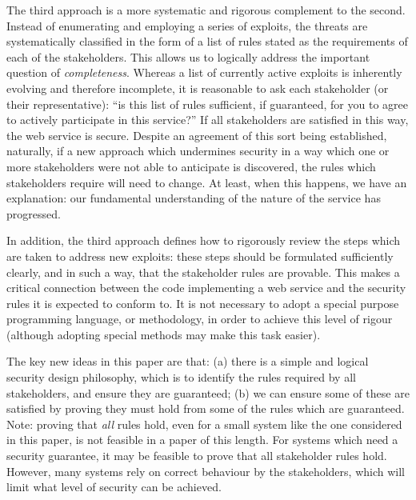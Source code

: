 The third approach is a more systematic and rigorous complement to the second. Instead
of enumerating and employing a series of exploits, the threats are systematically 
classified in the form of a list of rules stated as the requirements of each of the
stakeholders. This allows us to logically address the important question of {\em completeness}.
Whereas a list of currently active exploits is inherently evolving and therefore incomplete,
it is reasonable to ask each stakeholder (or their representative): ``is this list of rules
sufficient, if guaranteed, for you to agree to actively participate in this service?''
If all stakeholders are satisfied in this way, the web service is secure. Despite an agreement
of this sort being established, naturally, if a new approach which undermines security in
a way which one or more stakeholders were not able to anticipate is discovered, the rules
which stakeholders require will need to change. At least, when this happens, we have an explanation:
our fundamental understanding of the nature of the service has progressed.

In addition, the third approach defines how to rigorously review the steps which are taken
to address new exploits: these steps should be formulated sufficiently clearly, and in such
a way, that the stakeholder rules are provable. This makes a critical connection between
the code implementing a web service and the security rules it is expected to conform to.
It is not necessary to adopt a special purpose programming language, or methodology,
in order to achieve this level of rigour (although adopting special methods may
make this task easier).

The key new ideas in this paper are that: (a) there is a simple and logical security design
philosophy, which is to identify the rules required by all stakeholders,
and ensure they are guaranteed; (b) we can ensure some of these are
satisfied by proving they must hold from some of the rules which are
guaranteed. Note: proving that {\em all} rules hold, even for a small system
like the one considered in this paper, is not feasible in a paper of this length.
For systems which need a security guarantee, it may be feasible to prove that all
stakeholder rules hold. However, many systems rely on correct behaviour by the
stakeholders, which will limit what level of security can be achieved.

	





